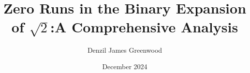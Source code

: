 
\title{\centering Zero Runs in the Binary Expansion of $\sqrt{2}$:\newline \centering A Comprehensive Analysis}
\author{Denzil James Greenwood}
\date{December 2024}



\maketitle

% 











\newpage
{} 
\label{sec:python_code, Zero Run Analysis Algorithm}


\newpage
{}
\label{sec:python_code, Zero Run Normality Analysis Algorithm}


